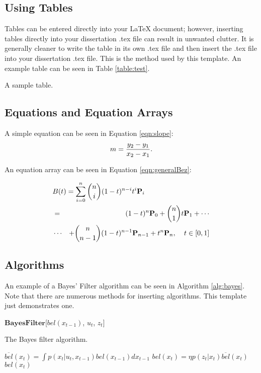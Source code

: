 \subsection{Using Tables}
Tables can be entered directly into your LaTeX document; however, inserting tables directly into your dissertation .tex file can result in unwanted clutter. It is generally cleaner to write the table in its own .tex file and then insert the .tex file into your dissertation .tex file. This is the method used by this template. An example table can be seen in Table \ref{table:test}.


\begin{table}
\scriptsize
\renewcommand{\tabcolsep}{0.09cm}
\centering

\caption{A sample table.}
\label{table:test}
\end{table}




\subsection{Equations and Equation Arrays}
A simple equation can be seen in Equation \ref{eqn:slope}:
\begin{equation}
\centering
m = \frac{y_{2} - y_{1}}{x_{2} - x_{1}}.
\label{eqn:slope}
\end{equation}

An equation array can be seen in Equation \ref{eqn:generalBez}: 

\begin{eqnarray}
\lefteqn{B(t) =  \sum_{i=0}^n \binom{n}{i} (1-t)^{n-i}t^{i}\mathbf{P}_i }\nonumber \\ 
& = & (1-t)^{n}\mathbf{P}_0 + \binom{n}{1}t\mathbf{P}_1+ \cdots  \nonumber \\
 &\cdots & + \binom{n}{n-1}(1-t)^{n-1}\mathbf{P}_{n-1} + t^{n}\mathbf{P}_n, \phantom{ttt} t \in [0,1]
\label{eqn:generalBez}
\end{eqnarray}

\subsection{Algorithms}
An example of a Bayes' Filter \citep*{Thrun2005} algorithm can be seen in Algorithm \ref{alg:bayes}. Note that there are numerous methods for inserting algorithms. This template just demonstrates one.

\begin{algorithm}{$\mathbf{Bayes Filter}$}[$bel(x_{t-1})$, $u_t$, $z_t$]
\caption{The Bayes filter algorithm.}
\label{alg:bayes}
\begin{algorithmic}[1]
\STATE $\overline{bel}(x_t) = \int p(x_t | u_t, x_{t-1}) bel(x_{t-1})dx_{t-1}$
\STATE $bel(x_t) = \eta p(z_t | x_t) \overline{bel}(x_t)$
\ENDFOR
\RETURN $bel(x_t)$
\end{algorithmic}
\end{algorithm}



